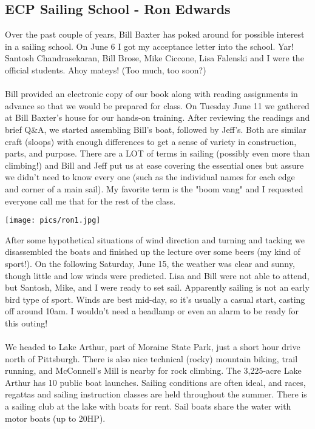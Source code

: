 \documentclass[10pt,a4paper]{article}
\newcommand\subsect[1]{%
  \subsection*{#1}%
  \addcontentsline{toc}{subsection}{#1}}
\newenvironment{Figure}
  {\par\medskip\noindent\minipage{\linewidth}}
  {\endminipage\par\medskip}
\begin{document}
\begin{multicols}{2}
\subsect{ECP Sailing School - Ron Edwards}
Over the past couple of years, Bill Baxter has poked around for possible interest in a sailing school.  
On June 6 I got my acceptance letter into the school.  Yar! Santosh Chandrasekaran, Bill Brose, Mike Ciccone, Lisa Falenski and I were the official students.  Ahoy mateys!  (Too much, too soon?)
\\
\\
Bill provided an electronic copy of our book along with reading assignments in advance so that we would be prepared for class.  On Tuesday June 11 we gathered at Bill Baxter's house for our hands-on training.  After reviewing the readings and brief Q\&A, we started assembling Bill's boat, followed by Jeff's.  Both are similar craft (sloops) with enough differences to get a sense of variety in construction, parts, and purpose.  There are a LOT of terms in sailing (possibly even more than climbing!) and Bill and Jeff put us at ease covering the essential ones but assure we didn't need to know every one (such as the individual names for each edge and corner of a main sail).  My favorite term is the "boom vang" and I requested everyone call me that for the rest of the class.
\begin{Figure}
 \centering
 \texttt{[image: pics/ron1.jpg]}
\end{Figure}
After some hypothetical situations of wind direction and turning and tacking we disassembled the boats and finished up the lecture over some beers (my kind of sport!). On the following Saturday, June 15, the weather was clear and sunny, though little and low winds were predicted.  Lisa and Bill were not able to attend, but Santosh, Mike, and I were ready to set sail.  Apparently sailing is not an early bird type of sport.  Winds are best mid-day, so it's usually a casual start, casting off around 10am.  I wouldn't need a headlamp or even an alarm to be ready for this outing!
\\
\\
We headed to Lake Arthur, part of Moraine State Park, just a short hour drive north of Pittsburgh. There is also nice technical (rocky) mountain biking, trail running, and McConnell's Mill is nearby for rock climbing.  The 3,225-acre Lake Arthur has 10 public boat launches. Sailing conditions are often ideal, and races, regattas and sailing instruction classes are held throughout the summer.  There is a sailing club at the lake with boats for rent.  Sail boats share the water with motor boats (up to 20HP).

\end{multicols}
\end{document}
